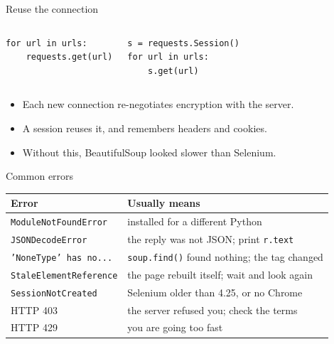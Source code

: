 \documentclass[11pt,aspectratio=169]{beamer}
\newenvironment{wideitemize}
  {\begin{itemize}\setlength{\itemsep}{10pt}}
  {\end{itemize}}
\begin{document}
\begin{frame}[fragile]{Reuse the connection}
\begin{columns}[T,onlytextwidth]
\begin{lstlisting}[style=py]
for url in urls:
    requests.get(url)
\end{lstlisting}
\begin{lstlisting}[style=py]
s = requests.Session()
for url in urls:
    s.get(url)
\end{lstlisting}
\end{columns}

\vspace{0.8em}
\begin{wideitemize}
  \item Each new connection re-negotiates encryption with the server.
  \item A session reuses it, and remembers headers and cookies.
  \item Without this, BeautifulSoup looked slower than Selenium.
\end{wideitemize}
\end{frame}

\begin{frame}{Common errors}
\begin{table}
\centering\footnotesize
\begin{tabular}{lp{7.2cm}}
\toprule
Error & Usually means \\
\midrule
\texttt{ModuleNotFoundError}   & installed for a different Python \\
\texttt{JSONDecodeError}       & the reply was not JSON; print \texttt{r.text} \\
\texttt{'NoneType' has no...}  & \texttt{soup.find()} found nothing; the tag changed \\
\texttt{StaleElementReference} & the page rebuilt itself; wait and look again \\
\texttt{SessionNotCreated}     & Selenium older than 4.25, or no Chrome \\
HTTP 403                       & the server refused you; check the terms \\
HTTP 429                       & you are going too fast \\
\bottomrule
\end{tabular}
\end{table}
\end{frame}
\end{document}
